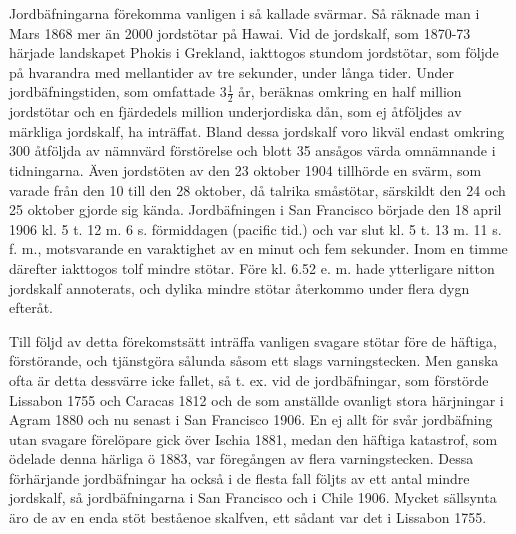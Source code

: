 \documentclass[a4paper, 12pt, oneside, swedish]{article}
\begin{document}
Jordbäfningarna förekomma vanligen i så kallade svärmar. Så räknade man i Mars 1868 mer än 2000 jordstötar på Hawai. Vid de jordskalf, som 1870-73 härjade landskapet Phokis i Grekland, iakttogos stundom jordstötar, som följde på hvarandra med mellantider av tre sekunder, under långa tider. Under jordbäfningstiden, som omfattade $3\frac{1}{2}$ år, beräknas omkring en half million jordstötar och en fjärdedels million underjordiska dån, som ej åtföljdes av märkliga jordskalf, ha inträffat. Bland dessa jordskalf voro likväl endast omkring 300 åtföljda av nämnvärd förstörelse och blott 35 ansågos värda omnämnande i tidningarna. Även jordstöten av den 23 oktober 1904 tillhörde en svärm, som varade från den 10 till den 28 oktober, då talrika småstötar, särskildt den 24 och 25 oktober gjorde sig kända. Jordbäfningen i San Francisco började den 18 april 1906 kl. 5 t. 12 m. 6 s. förmiddagen (pacific tid.) och var slut kl. 5 t. 13 m. 11 s. f. m., motsvarande en varaktighet av en minut och fem sekunder. Inom en timme därefter iakttogos tolf mindre stötar. Före kl. 6.52 e. m. hade ytterligare nitton jordskalf annoterats, och dylika mindre stötar återkommo under flera dygn efteråt.

Till följd av detta förekomstsätt inträffa vanligen svagare stötar före de häftiga, förstörande, och tjänstgöra sålunda såsom ett slags varningstecken. Men ganska ofta är detta dessvärre icke fallet, så t. ex. vid de jordbäfningar, som förstörde Lissabon 1755 och Caracas 1812 och de som anställde ovanligt stora härjningar i Agram 1880 och nu senast i San Francisco 1906. En ej allt för svår jordbäfning utan svagare förelöpare gick över Ischia 1881, medan den häftiga katastrof, som ödelade denna härliga ö 1883, var föregången av flera varningstecken. Dessa förhärjande jordbäfningar ha också i de flesta fall följts av ett antal mindre jordskalf, så jordbäfningarna i San Francisco och i Chile 1906. Mycket sällsynta äro de av en enda stöt beståenoe skalfven, ett sådant var det i Lissabon 1755.
\end{document}
